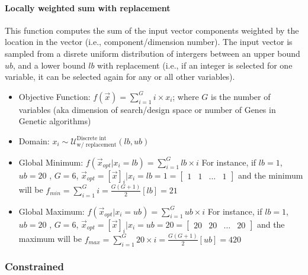 \paragraph{Locally weighted sum with replacement}
This function computes the sum of the input vector components weighted by the location in the vector (i.e., component/dimension number). The input vector is sampled from a disrete uniform distribution of intergers between an upper bound $ub$, and a lower bound $lb$ with replacement (i.e., if an integer is selected for one variable, it can be selected again for any or all other variables).
\begin{itemize}
	\item Objective Function: $f(\vec{x}) = \sum_{i=1}^{G}i \times x_i$; where $G$ is the number of variables (aka dimension of search/design space or number of Genes in Genetic algorithms)
	\item Domain: $x_i \sim \mathcal{U}^{\text{Discrete int}}_{\text{w/ replacement}} (lb,ub)$
	\item Global Minimum: $f(\vec{x}_{opt}|x_i = lb) = \sum_{i=1}^{G} lb \times i$
	For instance, if $lb =1$, $ub=20$ , $G=6$, $\vec{x}_{opt} = [\vec{x}]_i | x_i = lb = 1 = \begin{bmatrix}
	1 & 1 & \dots & 1 \end{bmatrix}$ and the minimum will be $f_{min} = \sum_{i=1}^{G} i = \frac{G(G+1)}{2}[lb] = 21$
	\item Global Maximum: $f(\vec{x}_{opt}|x_i = ub) = \sum_{i=1}^{G} ub \times i$
	For instance, if $lb =1$, $ub=20$ , $G=6$, $\vec{x}_{opt} = [\vec{x}]_i | x_i = ub = 20 = \begin{bmatrix}
	20 & 20 & \dots & 20 \end{bmatrix}$ and the maximum will be $f_{max} = \sum_{i=1}^{G} 20 \times i = \frac{G(G+1)}{2}[ub] = 420$
\end{itemize}

\subsubsection{Constrained}
